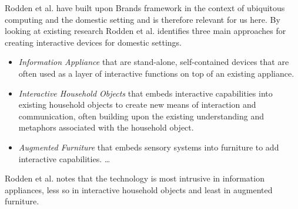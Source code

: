 Rodden et al. \cite{rodden2003evolution} have built upon Brands framework in the context of ubiquitous computing and the domestic setting and is therefore relevant for us here.
By looking at existing research Rodden et al. identifies three main approaches for creating interactive devices for domestic settings.

\begin{itemize}
  \item \emph{Information Appliance} that are stand-alone, self-contained devices that are often used as a layer of interactive functions on top of an existing appliance.
  \item \emph{Interactive Household Objects} that embeds interactive capabilities into existing household objects to create new means of interaction and communication, often building upon the existing understanding and metaphors associated with the household object.
  \item \emph{Augmented Furniture} that embeds sensory systems into furniture to add interactive capabilities. \ldots
\end{itemize}

Rodden et al. notes that the technology is most intrusive in information appliances, less so in interactive household objects and least in augmented furniture.

